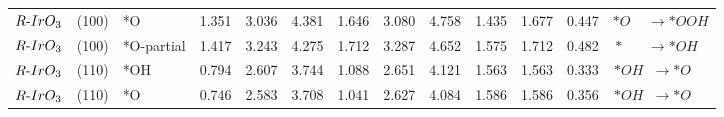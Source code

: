 \begin{tabular}{lllcccccccccc}
      $R{\text -}IrO_{3}$ &    (100) &          *O &           1.351 &          3.036 &            4.381 &           1.646 &          3.080 &            4.758 &                        1.435 &     1.677 &  0.447 &                         $*O \phantom{T} \phantom{T}  \rightarrow *OOH$ \\
      $R{\text -}IrO_{3}$ &    (100) &  *O-partial &           1.417 &          3.243 &            4.275 &           1.712 &          3.287 &            4.652 &                        1.575 &     1.712 &  0.482 &  $* \phantom{T} \phantom{T} \phantom{T}  \rightarrow *OH \phantom{T} $ \\
      $R{\text -}IrO_{3}$ &    (110) &         *OH &           0.794 &          2.607 &            3.744 &           1.088 &          2.651 &            4.121 &                        1.563 &     1.563 &  0.333 &              $*OH \phantom{T} \rightarrow *O \phantom{T} \phantom{T} $ \\
      $R{\text -}IrO_{3}$ &    (110) &          *O &           0.746 &          2.583 &            3.708 &           1.041 &          2.627 &            4.084 &                        1.586 &     1.586 &  0.356 &              $*OH \phantom{T} \rightarrow *O \phantom{T} \phantom{T} $ \\
\bottomrule
\end{tabular}
